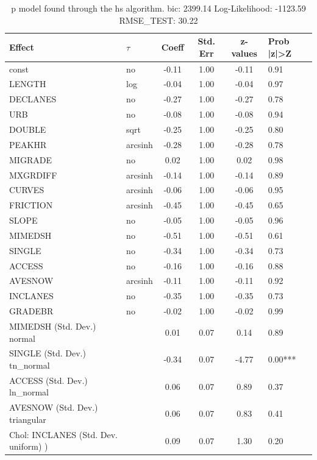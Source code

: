 \begin{table}
	\caption{p model found through the hs algorithm. bic: 2399.14 Log-Likelihood: -1123.59 RMSE_TEST: 30.22}
	\begin{center}
		\begin{tabular}{|l|l|c|c|c|l|}
			\hline
			Effect & $\tau$ & Coeff & Std. Err & z-values & Prob |z|>Z \\
			\hline
			const & no & -0.11 & 1.00 & -0.11 & 0.91 \\
			\hline
			LENGTH & log & -0.04 & 1.00 & -0.04 & 0.97 \\
			\hline
			DECLANES & no & -0.27 & 1.00 & -0.27 & 0.78 \\
			\hline
			URB & no & -0.08 & 1.00 & -0.08 & 0.94 \\
			\hline
			DOUBLE & sqrt & -0.25 & 1.00 & -0.25 & 0.80 \\
			\hline
			PEAKHR & arcsinh & -0.28 & 1.00 & -0.28 & 0.78 \\
			\hline
			MIGRADE & no & 0.02 & 1.00 & 0.02 & 0.98 \\
			\hline
			MXGRDIFF & arcsinh & -0.14 & 1.00 & -0.14 & 0.89 \\
			\hline
			CURVES & arcsinh & -0.06 & 1.00 & -0.06 & 0.95 \\
			\hline
			FRICTION & arcsinh & -0.45 & 1.00 & -0.45 & 0.65 \\
			\hline
			SLOPE & no & -0.05 & 1.00 & -0.05 & 0.96 \\
			\hline
			MIMEDSH & no & -0.51 & 1.00 & -0.51 & 0.61 \\
			\hline
			SINGLE & no & -0.34 & 1.00 & -0.34 & 0.73 \\
			\hline
			ACCESS & no & -0.16 & 1.00 & -0.16 & 0.88 \\
			\hline
			AVESNOW & arcsinh & -0.11 & 1.00 & -0.11 & 0.92 \\
			\hline
			INCLANES & no & -0.35 & 1.00 & -0.35 & 0.73 \\
			\hline
			GRADEBR & no & -0.02 & 1.00 & -0.02 & 0.99 \\
			\hline
			MIMEDSH (Std. Dev.) normal &  & 0.01 & 0.07 & 0.14 & 0.89 \\
			\hline
			SINGLE (Std. Dev.) tn_normal &  & -0.34 & 0.07 & -4.77 & 0.00*** \\
			\hline
			ACCESS (Std. Dev.) ln_normal &  & 0.06 & 0.07 & 0.89 & 0.37 \\
			\hline
			AVESNOW (Std. Dev.) triangular &  & 0.06 & 0.07 & 0.83 & 0.41 \\
			\hline
			 Chol: INCLANES (Std. Dev. uniform) ) &  & 0.09 & 0.07 & 1.30 & 0.20 \\

\end{tabular}
\end{center}
\end{table}
